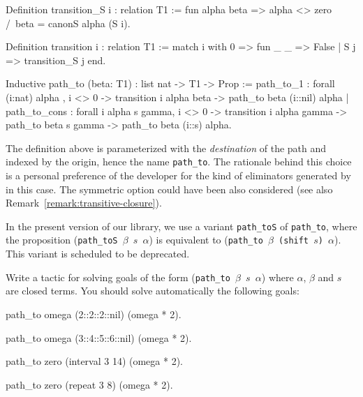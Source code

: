 \begin{Coqsrc}
Definition transition_S i : relation T1 :=
fun alpha beta =>
    alpha <> zero /\ beta = canonS alpha (S i).

Definition transition i : relation T1 :=
  match i with 0 => fun _ _ => False | S j => transition_S j end.

Inductive path_to (beta: T1) : list nat -> T1 -> Prop :=
  path_to_1 : forall (i:nat) alpha , 
    i <> 0 ->
    transition i alpha beta ->
    path_to beta (i::nil) alpha
| path_to_cons : forall i alpha s gamma,
    i <> 0 ->
    transition i alpha gamma ->
    path_to beta  s gamma ->
    path_to beta  (i::s) alpha.
\end{Coqsrc}



\begin{remark}
The definition above is parameterized with the \emph{destination} of the path and indexed by the origin, hence the name \texttt{path\_to}. The rationale behind this choice is a personal preference of the developer  for the kind of eliminators generated by \coq{} in this case. The symmetric option could have been also considered (see also Remark~\vref{remark:transitive-closure}).
\end{remark}



\begin{remark}
In the present version of our library, we use a variant \texttt{path\_toS} of
\texttt{path\_to}, where the proposition
(\texttt{path\_toS $\beta$ $s$ $\alpha$}) is equivalent to
(\texttt{path\_to $\beta$ (shift $s$) $\alpha$}). This variant is scheduled to be deprecated.
\end{remark}


\begin{exercise}
Write a tactic for solving goals of the form (\texttt{path\_to $\beta$ $s$ $\alpha$})
where $\alpha$, $\beta$ and $s$ are closed terms. 
You should solve automatically the following goals:

\begin{Coqsrc}
 path_to omega (2::2::2::nil) (omega * 2).

 path_to omega (3::4::5::6::nil) (omega * 2).

 path_to zero (interval 3 14) (omega * 2).

 path_to zero (repeat 3 8) (omega * 2).
\end{Coqsrc}

\end{exercise}



